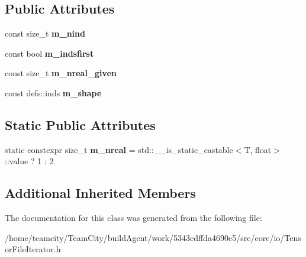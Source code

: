 \subsection*{Public Attributes}
\begin{DoxyCompactItemize}
\item 
const size\+\_\+t {\bfseries m\+\_\+nind}\hypertarget{classTensorFileIterator_a481d3716868296e255edad5ffc42e7ae}{}\label{classTensorFileIterator_a481d3716868296e255edad5ffc42e7ae}

\item 
const bool {\bfseries m\+\_\+indsfirst}\hypertarget{classTensorFileIterator_a472db03c84fc8cfc8de1de758fb04431}{}\label{classTensorFileIterator_a472db03c84fc8cfc8de1de758fb04431}

\item 
const size\+\_\+t {\bfseries m\+\_\+nreal\+\_\+given}\hypertarget{classTensorFileIterator_a08239d7622fbc3ddec6420f818868354}{}\label{classTensorFileIterator_a08239d7622fbc3ddec6420f818868354}

\item 
const defs\+::inds {\bfseries m\+\_\+shape}\hypertarget{classTensorFileIterator_a06a3fd8c3bd0abb9fedea7b3af07c0ca}{}\label{classTensorFileIterator_a06a3fd8c3bd0abb9fedea7b3af07c0ca}

\end{DoxyCompactItemize}
\subsection*{Static Public Attributes}
\begin{DoxyCompactItemize}
\item 
static constexpr size\+\_\+t {\bfseries m\+\_\+nreal} = std\+::\+\_\+\+\_\+is\+\_\+static\+\_\+castable$<$T, float$>$\+::value ? 1 \+: 2\hypertarget{classTensorFileIterator_a00ddc24bcbff039f39ece564b89bbf32}{}\label{classTensorFileIterator_a00ddc24bcbff039f39ece564b89bbf32}

\end{DoxyCompactItemize}
\subsection*{Additional Inherited Members}


The documentation for this class was generated from the following file\+:\begin{DoxyCompactItemize}
\item 
/home/teamcity/\+Team\+City/build\+Agent/work/5343cdffda4690e5/src/core/io/Tensor\+File\+Iterator.\+h\end{DoxyCompactItemize}
